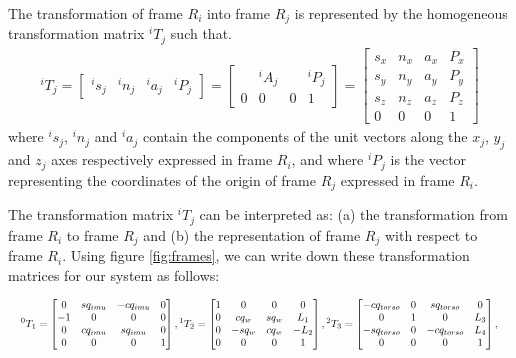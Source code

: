 \documentclass[a4paper,10pt]{article}
\newcommand\scalemath[2]{\scalebox{#1}{\mbox{\ensuremath{\displaystyle #2}}}}
\begin{document}
The transformation of frame $R_i$ into frame $R_j$ is represented by the homogeneous transformation matrix
${}^{i}T_j$ such that.
\begin{align}
 {}^{i}T_j = \left[\begin{matrix}{}^{i}s_j & {}^{i}n_j & {}^{i}a_j & {}^{i}P_j \end{matrix} \right] 
  = \left[\begin{matrix} & {}^iA_j & & {}^iP_j \\ 0 & 0 & 0 & 1 \end{matrix}\right]
  = \left[\begin{matrix}s_x & n_x & a_x & P_x  \\ s_y & n_y & a_y & P_y 
  \\ s_z & n_z & a_z & P_z \\ 0 & 0 & 0 & 1 \end{matrix} \right]
\end{align}
where ${}^is_j$, ${}^in_j$ and ${}^ia_j$ contain the components of the unit vectors along the $x_j$, 
$y_j$ and $z_j$ axes respectively expressed in frame $R_i$, and where ${}^iP_j$ is the vector representing
the coordinates of the origin of frame $R_j$ expressed in frame $R_i$.

The transformation matrix ${}^iT_j$ can be interpreted as: (a) the transformation from frame $R_i$ to frame $R_j$
and (b) the representation of frame $R_j$ with respect to frame $R_i$. Using figure \ref{fig:frames}, we can
write down these transformation matrices for our system as follows:

\[
 \scalemath{0.75}{{}^0T_1 = \left[\begin{matrix} 0 & sq_{imu} & -cq_{imu} & 0 \\ -1 & 0 & 0 & 0 \\ 0 & cq_{imu} & sq_{imu} & 0 \\ 0 & 0 & 0 & 1 \end{matrix}\right],
 {}^1T_2 = \left[\begin{matrix} 1 & 0 & 0 & 0 \\ 0 & cq_w & sq_w & L_1 \\ 0 & -sq_w & cq_w & -L_2 \\ 0 & 0 & 0 & 1 \end{matrix}\right], 
 {}^2T_3 = \left[\begin{matrix} -cq_{torso} & 0 & sq_{torso} & 0 \\ 0 & 1 & 0 & L_3 \\ -sq_{torso} & 0 & -cq_{torso} & L_4 \\ 0 & 0 & 0 & 1 \end{matrix}\right],}
\]
\end{document}
